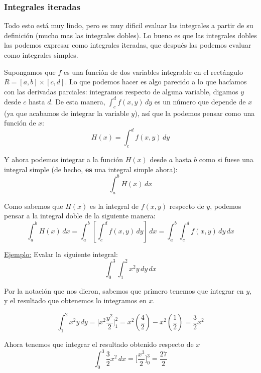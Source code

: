 \documentclass[12pt]{article}
\begin{document}
\subsubsection{Integrales iteradas}
Todo esto está muy lindo, pero es muy dificil evaluar las integrales a partir de su definición (mucho mas las integrales dobles). Lo bueno es que las integrales dobles las podemos expresar como integrales iteradas, que después las podemos evaluar como integrales simples.

Supongamos que $ f $ es una función de dos variables integrable en el rectángulo $ R=\left[a,b\right]\times \left[c,d\right] $. Lo que podemos hacer es algo parecido a lo que hacíamos con las derivadas parciales: integramos respecto de alguna variable, digamos $ y $ desde $ c $ hasta $ d $. De esta manera, $ \int_{c}^{d} f(x,y) \,dy $ es un número que depende de $ x $ (ya que acabamos de integrar la variable $ y $), así que la podemos pensar como una función de $ x $:
\[
  H(x)=\int_{c}^{d} f(x,y) \,dy
\]

Y ahora podemos integrar a la función $ H(x) $ desde $ a $ hasta $ b $ como si fuese una integral simple (de hecho, \textbf{es} una integral simple ahora):
\[
  \int_{a}^{b} H(x) \,dx
\]

Como sabemos que $ H(x) $ es la integral de $ f(x,y) $ respecto de $ y $, podemos pensar a la integral doble de la siguiente manera:
\[
  \int_{a}^{b} H(x) \,dx = \int_{a}^{b} \left[\int_{c}^{d} f(x,y) \,dy\right] \,dx = \int_{a}^{b} \int_{c}^{d} f(x,y) \,dy\,dx
\]

\underline{Ejemplo:} Evalar la siguiente integral:
\[
  \int_{0}^{3} \int_{1}^{2} x^2y \,dy\,dx
\]

Por la notación que nos dieron, sabemos que primero tenemos que integrar en $ y $, y el resultado que obtenemos lo integramos en $ x $.

\[
  \int_{1}^{2} x^2y \,dy = \Bigg[x^2\frac{y^2}{2}\Bigg]_{1}^{2} = x^2\left(\frac{4}{2}\right) - x^2\left(\frac{1}{2}\right) = \frac{3}{2}x^2
\]

Ahora tenemos que integrar el resultado obtenido respecto de $ x $
\[
  \int_{0}^{3} \frac{3}{2}x^2 \,dx = \Bigg[\frac{x^3}{2}\Bigg]_{0}^{3}=\frac{27}{2}
\]

\vspace{0.2cm}
\vspace{0.2cm}
\end{document}
